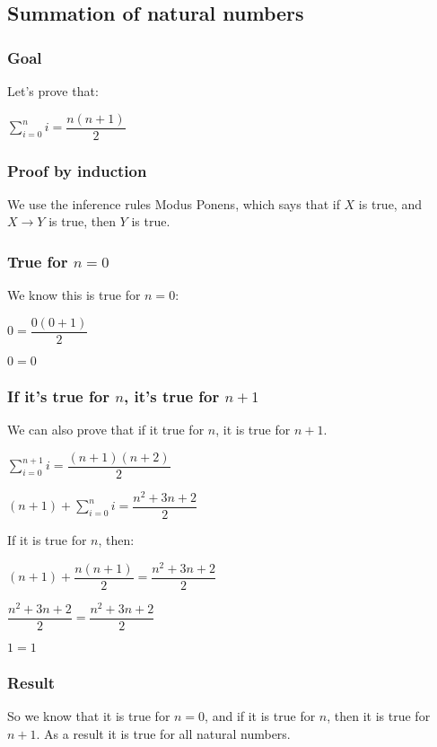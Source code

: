 
\subsection{Summation of natural numbers}


\subsubsection{Goal}

Let's prove that:

\(\sum_{i=0}^n i= \dfrac{n(n+1)}{2}\)

\subsubsection{Proof by induction}

We use the inference rules Modus Ponens, which says that if \(X\) is true, and \(X\rightarrow Y\) is true, then \(Y\) is true.

\subsubsection{True for \(n=0\)}

We know this is true for \(n=0\):

\(0=\dfrac{0(0+1)}{2}\)

\(0=0\)

\subsubsection{If it's true for \(n\), it's true for \(n+1\)}

We can also prove that if it true for \(n\), it is true for \(n+1\).

\(\sum_{i=0}^{n+1} i= \dfrac{(n+1)(n+2)}{2}\)

\((n+1)+\sum_{i=0}^{n} i= \dfrac{n^2 +3n +2}{2}\)

If it is true for \(n\), then:

\((n+1)+\dfrac{n(n+1)}{2}= \dfrac{n^2 +3n +2}{2}\)

\(\dfrac{n^2+3n+2}{2}= \dfrac{n^2 +3n +2}{2}\)

\(1=1\)

\subsubsection{Result}

So we know that it is true for \(n=0\), and if it is true for \(n\), then it is true for \(n+1\). As a result it is true for all natural numbers.

